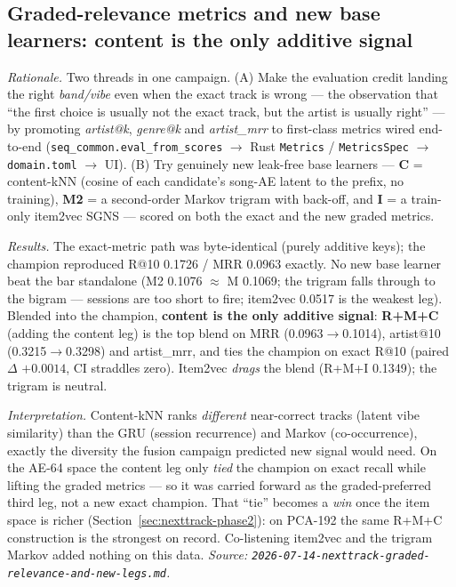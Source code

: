 \documentclass[11pt]{article}
\begin{document}
\subsection{Graded-relevance metrics and new base learners: content is the only additive signal}
\label{sec:nexttrack-graded}
\emph{Rationale.} Two threads in one campaign. (A) Make the evaluation credit
landing the right \emph{band/vibe} even when the exact track is wrong --- the
observation that ``the first choice is usually not the exact track, but the
artist is usually right'' --- by promoting \emph{artist@k}, \emph{genre@k} and
\emph{artist\_mrr} to first-class metrics wired end-to-end
(\texttt{seq\_common.eval\_from\_scores} $\to$ Rust \texttt{Metrics} /
\texttt{MetricsSpec} $\to$ \texttt{domain.toml} $\to$ UI). (B) Try genuinely new
leak-free base learners --- \textbf{C} = content-kNN (cosine of each candidate's
song-AE latent to the prefix, no training), \textbf{M2} = a second-order Markov
trigram with back-off, and \textbf{I} = a train-only item2vec SGNS --- scored on
both the exact and the new graded metrics.

\emph{Results.} The exact-metric path was byte-identical (purely additive
keys); the champion reproduced R@10 \num{0.1726} / MRR \num{0.0963} exactly. No
new base learner beat the bar standalone (M2 \num{0.1076} $\approx$ M
\num{0.1069}; the trigram falls through to the bigram --- sessions are too short
to fire; item2vec \num{0.0517} is the weakest leg). Blended into the champion,
\textbf{content is the only additive signal}: \textbf{R+M+C} (adding the content
leg) is the top blend on MRR (\num{0.0963}$\to$\num{0.1014}), artist@10
(\num{0.3215}$\to$\num{0.3298}) and artist\_mrr, and ties the champion on exact
R@10 (paired $\Delta$ $+\num{0.0014}$, CI straddles zero). Item2vec \emph{drags}
the blend (R+M+I \num{0.1349}); the trigram is neutral.

\emph{Interpretation.} Content-kNN ranks \emph{different} near-correct tracks
(latent vibe similarity) than the GRU (session recurrence) and Markov
(co-occurrence), exactly the diversity the fusion campaign predicted new signal
would need. On the AE-64 space the content leg only \emph{tied} the champion on
exact recall while lifting the graded metrics --- so it was carried forward as
the graded-preferred third leg, not a new exact champion. That ``tie'' becomes a
\emph{win} once the item space is richer (Section~\ref{sec:nexttrack-phase2}):
on PCA-192 the same R+M+C construction is the strongest on record. Co-listening
item2vec and the trigram Markov added nothing on this data.
\emph{Source: \texttt{2026-07-14-nexttrack-graded-relevance-and-new-legs.md}.}
\end{document}

